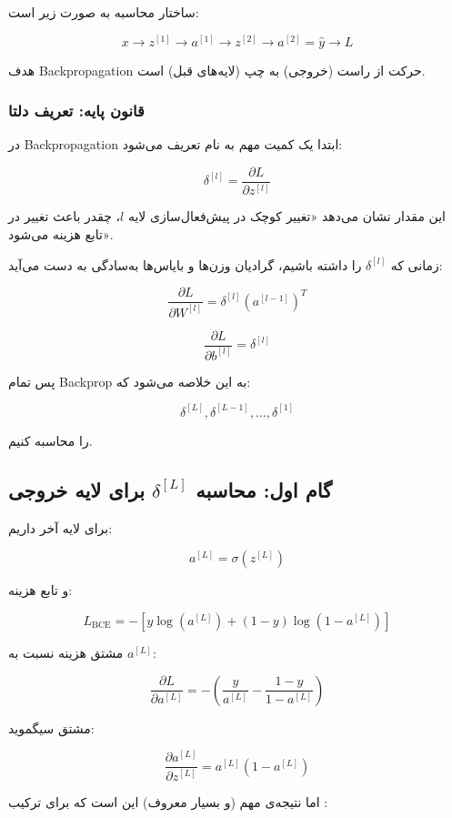 \documentclass{article}
\begin{document}
ساختار محاسبه به صورت زیر است:

\[
x \rightarrow z^{[1]} \rightarrow a^{[1]} 
\rightarrow z^{[2]} \rightarrow a^{[2]}=\hat{y} \rightarrow L
\]

هدف Backpropagation حرکت از راست (خروجی) به چپ (لایه‌های قبل) است.

\subsubsection*{قانون پایه: تعریف دلتا}

در Backpropagation ابتدا یک کمیت مهم به نام  تعریف می‌شود:

\[
\delta^{[l]} = \frac{\partial L}{\partial z^{[l]}}
\]

این مقدار نشان می‌دهد «تغییر کوچک در پیش‌فعال‌سازی لایه \(l\)، چقدر باعث تغییر در تابع هزینه می‌شود».

زمانی که \(\delta^{[l]}\) را داشته باشیم، گرادیان وزن‌ها و بایاس‌ها به‌سادگی به دست می‌آید:

\[
\frac{\partial L}{\partial W^{[l]}} = \delta^{[l]} (a^{[l-1]})^T
\]

\[
\frac{\partial L}{\partial b^{[l]}} = \delta^{[l]}
\]

پس تمام Backprop به این خلاصه می‌شود که:

\[
\delta^{[L]}, \delta^{[L-1]}, \dots, \delta^{[1]}
\]

را محاسبه کنیم.

\subsection*{گام اول: محاسبه \(\delta^{[L]}\) برای لایه خروجی}

برای لایه آخر داریم:

\[
a^{[L]} = \sigma(z^{[L]})
\]

و تابع هزینه:

\[
L_{\text{BCE}} = 
- \left[ y\log(a^{[L]}) + (1-y)\log(1-a^{[L]}) \right]
\]

مشتق هزینه نسبت به \(a^{[L]}\):

\[
\frac{\partial L}{\partial a^{[L]}} 
= -\left(\frac{y}{a^{[L]}} - \frac{1-y}{1-a^{[L]}}\right)
\]

مشتق سیگموید:

\[
\frac{\partial a^{[L]}}{\partial z^{[L]}} 
= a^{[L]}(1-a^{[L]})
\]

اما نتیجه‌ی مهم (و بسیار معروف) این است که برای ترکیب :
\end{document}
